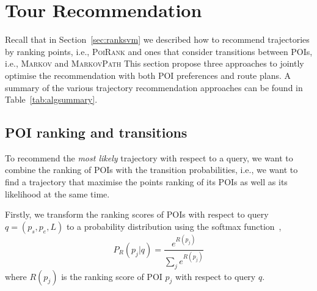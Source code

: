 
\section{Tour Recommendation}
\label{sec:recommendation}
\secmoveup

Recall that in Section~\ref{sec:ranksvm} we described how to recommend trajectories by ranking points,
i.e., \textsc{PoiRank} %
and ones that consider transitions between POIs, i.e., \textsc{Markov} and \textsc{MarkovPath}
This section propose three approaches to %
jointly optimise the recommendation with both POI preferences and route plans.
A summary of the various trajectory recommendation approaches can be found in Table~\ref{tab:algsummary}.


\subsection{POI ranking and transitions}
\label{sec:rank+markov}
\secmoveup


To recommend the \textit{most likely} trajectory with respect to a query,
we want to combine the ranking of POIs with the transition probabilities,
i.e., we want to find a trajectory that maximise the points ranking of its POIs
as well as its likelihood at the same time.

Firstly, we transform the ranking scores of POIs with respect to query $q = (p_s, p_e, L)$
to a probability distribution using the softmax function~\cite{bishop2006},
\begin{equation}
  \label{eq:poi-probability}
  P_R(p_j | q) = \frac{e^{R(p_j)}}{\sum_j e^{R(p_j)}}
\end{equation}
where $R(p_j)$ is the ranking score of POI $p_j$ with respect to query $q$.


